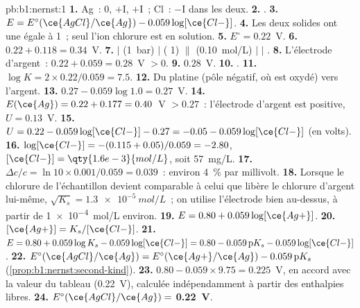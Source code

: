 \begin{solution}{pb:b1:nernst:1}
\textbf{1.} Ag~: 0, $+$I, $+$I~; Cl~: $-$I dans les deux.
\textbf{2.} .
\textbf{3.} $E = E^\circ(\ce{AgCl}/\ce{Ag}) - 0.059\log[\ce{Cl-}]$.
\textbf{4.} Les deux solides ont une  égale à 1~; seul l'ion
chlorure est en solution.
\textbf{5.} $E^\circ = 0.22$~V.
\textbf{6.} $0.22 + 0.118 = 0.34$~V.
\textbf{7.}  $|$  (\qty{1}{bar}) $|$  ( 1)
$\|$  (\qty{0.10}{mol/L}) $|$  $|$ .
\textbf{8.} L'électrode d'argent~: $0.22 + 0.059 = 0.28$~V $> 0$.
\textbf{9.} $0.28$~V.
\textbf{10.} .
\textbf{11.} $\log K = 2 \times 0.22/0.059 = 7.5$.
\textbf{12.} Du platine (pôle négatif, où  est oxydé) vers
l'argent.
\textbf{13.} $0.27 - 0.059\log 1.0 = 0.27$~V.
\textbf{14.} $E(\ce{Ag}) = 0.22 + 0.177 = 0.40$~V $> 0.27$~: l'électrode
d'argent est positive, $U = 0.13$~V.
\textbf{15.} $U = 0.22 - 0.059\log[\ce{Cl-}] - 0.27 = -0.05 -
0.059\log[\ce{Cl-}]$ (en volts).
\textbf{16.} $\log[\ce{Cl-}] = -(0.115 + 0.05)/0.059 = -2.80$,
$[\ce{Cl-}] = \qty{1.6e-3}{mol/L}$, soit \qty{57}{mg/L}.
\textbf{17.} $\Delta c/c = \ln 10 \times 0.001/0.059 = 0.039$~: environ
\qty{4}{\percent} par millivolt.
\textbf{18.} Lorsque le chlorure de l'échantillon devient comparable à
celui que libère le chlorure d'argent lui-même,
$\sqrt{K_s} = \qty{1.3e-5}{mol/L}$~; on utilise l'électrode bien au-dessus, à partir
de \qty{1e-4}{mol/L} environ.
\textbf{19.} $E = 0.80 + 0.059\log[\ce{Ag+}]$.
\textbf{20.} $[\ce{Ag+}] = K_s/[\ce{Cl-}]$.
\textbf{21.} $E = 0.80 + 0.059\log K_s - 0.059\log[\ce{Cl-}] = 0.80 -
0.059\,\mathrm{p}K_s - 0.059\log[\ce{Cl-}]$.
\textbf{22.} $E^\circ(\ce{AgCl}/\ce{Ag}) = E^\circ(\ce{Ag+}/\ce{Ag}) -
0.059\,\mathrm{p}K_s$ (\cref{prop:b1:nernst:second-kind}).
\textbf{23.} $0.80 - 0.059 \times 9.75 = 0.225$~V, en accord avec la
valeur du tableau (0.22~V), calculée indépendamment à partir des
enthalpies libres.
\textbf{24.} $E^\circ(\ce{AgCl}/\ce{Ag}) = $ \textbf{0.22~V}.
\end{solution}

